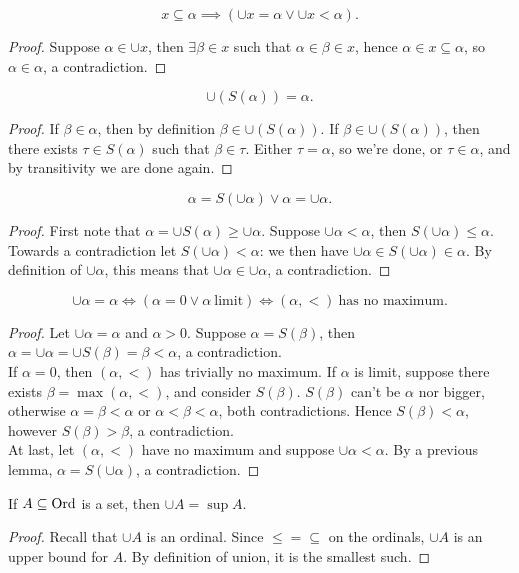 \documentclass[twoside,openright,titlepage,numbers=noenddot,%
               headinclude,footinclude,cleardoublepage=empty,abstract=on,
               BCOR=23mm,paper=letter,fontsize=11pt
               ]{scrreprt}
\begin{document}
\begin{lemma}
    \[ x \subseteq \alpha \implies (\cup x = \alpha \lor \cup x < \alpha). \]
\end{lemma}
\begin{proof}
    Suppose $\alpha \in \cup x$, then $\exists \beta \in x$ such that $\alpha \in \beta \in x$, hence $\alpha \in x \subseteq \alpha$, so $\alpha \in \alpha$, a contradiction.
\end{proof}
\begin{lemma}
    \[ \cup(S(\alpha)) = \alpha. \]
\end{lemma}
\begin{proof}
    If $\beta \in \alpha$, then by definition $\beta \in \cup(S(\alpha))$. If $\beta \in \cup(S(\alpha))$, then there exists $\tau \in S(\alpha)$ such that $\beta \in \tau$. Either $\tau = \alpha$, so we're done, or $\tau \in \alpha$, and by transitivity we are done again.
\end{proof}
\begin{lemma}
    \[ \alpha = S(\cup\alpha) \lor \alpha = \cup\alpha. \]
\end{lemma}
\begin{proof}
    First note that $\alpha = \cup S(\alpha) \geq \cup\alpha$. Suppose $\cup\alpha < \alpha$, then $S(\cup\alpha) \leq \alpha$. Towards a contradiction let $S(\cup\alpha) < \alpha$: we then have $\cup\alpha \in S(\cup\alpha) \in \alpha$. By definition of $\cup\alpha$, this means that $\cup\alpha \in \cup\alpha$, a contradiction.
\end{proof}
\begin{lemma}
    \[ \cup\alpha = \alpha \iff (\alpha = 0 \lor \alpha \ \text{limit}) \iff (\alpha,<) \ \text{has no maximum}. \]
\end{lemma}
\begin{proof}
    Let $\cup\alpha = \alpha$ and $\alpha > 0$. Suppose $\alpha = S(\beta)$, then $\alpha = \cup\alpha = \cup S(\beta) = \beta < \alpha$, a contradiction. \\
    If $\alpha = 0$, then $(\alpha, <)$ has trivially no maximum. If $\alpha$ is limit, suppose there exists $\beta = \max(\alpha, <)$, and consider $S(\beta)$. $S(\beta)$ can't be $\alpha$ nor bigger, otherwise $\alpha = \beta < \alpha$ or $\alpha < \beta < \alpha$, both contradictions. Hence $S(\beta) < \alpha$, however $S(\beta) > \beta$, a contradiction. \\
    At last, let $(\alpha, <)$ have no maximum and suppose $\cup \alpha < \alpha$. By a previous lemma, $\alpha = S(\cup\alpha)$, a contradiction.
\end{proof}
\begin{lemma}
    If $A \subseteq \mathrm{Ord}$ is a set, then $\cup A = \sup A$.
\end{lemma}
\begin{proof}
    Recall that $\cup A$ is an ordinal. Since $\leq = \subseteq$ on the ordinals, $\cup A$ is an upper bound for $A$. By definition of union, it is the smallest such.
\end{proof}
\end{document}
